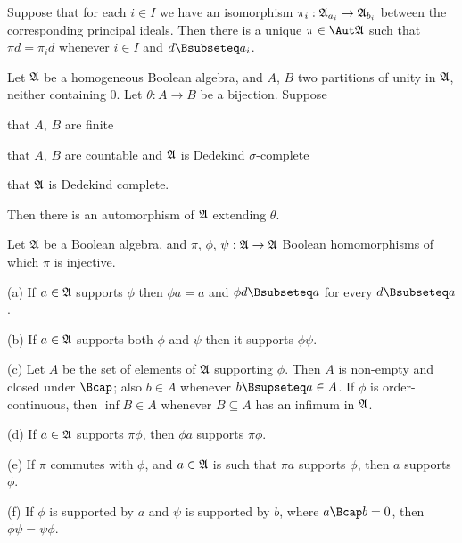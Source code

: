 \noindent Suppose that for each $i\in I$ we have an isomorphism
$\pi_i:\frak A_{a_i}\to\frak A_{b_i}$ between the corresponding
principal ideals.   Then there is a unique $\pi\in\Aut\frak A$ such that
$\pi d=\pi_id$ whenever $i\in I$ and $d\Bsubseteq a_i$.


 Let $\frak A$ be a homogeneous Boolean
algebra,
and $A$, $B$ two partitions of unity in $\frak A$, neither containing
$0$.   Let $\theta:A\to B$ be a bijection.   Suppose

 that $A$, $B$ are finite

 that $A$, $B$ are countable and $\frak A$ is Dedekind
$\sigma$-complete

 that $\frak A$ is Dedekind complete.

\noindent Then there is an automorphism of $\frak A$ extending $\theta$.


 Let $\frak A$ be a Boolean algebra, and $\pi$,
$\phi$, $\psi:\frak A\to\frak A$ Boolean homomorphisms of which $\pi$ is
injective.

(a) If $a\in\frak A$ supports $\phi$ then $\phi a=a$ and
$\phi d\Bsubseteq a$ for every $d\Bsubseteq a$.

(b) If $a\in\frak A$ supports both $\phi$ and $\psi$ then it supports
$\phi\psi$.

(c) Let $A$ be the set of elements of $\frak A$
supporting $\phi$.   Then $A$ is non-empty and closed under $\Bcap$;
also $b\in A$ whenever $b\Bsupseteq a\in A$.   If $\phi$ is
order-continuous, then $\inf B\in A$ whenever $B\subseteq A$ has an
infimum in $\frak A$.

(d) If $a\in\frak A$ supports $\pi\phi$, then $\phi a$ supports
$\pi\phi$.

(e) If $\pi$ commutes with $\phi$, and $a\in\frak A$ is such that
$\pi a$ supports $\phi$, then $a$ supports $\phi$.

(f) If $\phi$ is supported by $a$ and $\psi$ is supported by $b$, where
$a\Bcap b=0$, then $\phi\psi=\psi\phi$.

